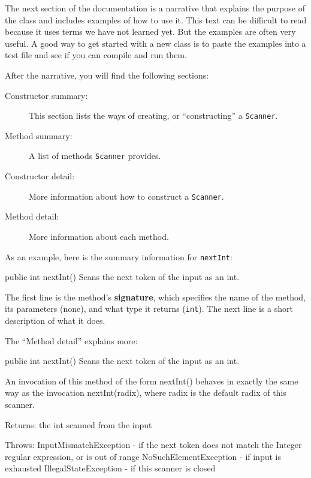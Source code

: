 \documentclass[12pt]{book}
\theoremstyle{exercise}
\newcommand{\java}[1]{\verb"#1"}
\newcommand{\java}[1]{\lstinline{#1}} %
\begin{document}

The next section of the documentation is a narrative that explains the purpose of the class and includes examples of how to use it.
This text can be difficult to read because it uses terms we have not learned yet.
But the examples are often very useful.
A good way to get started with a new class is to paste the examples into a test file and see if you can compile and run them.

After the narrative, you will find the following sections:

\begin{description}

\item[Constructor summary:]
This section lists the ways of creating, or ``constructing'' a \java{Scanner}.

\item[Method summary:]
A list of methods \java{Scanner} provides.

\item[Constructor detail:]
More information about how to construct a \java{Scanner}.

\item[Method detail:]
More information about each method.

\end{description}

As an example, here is the summary information for \java{nextInt}:

\begin{stdout}
public int nextInt()
Scans the next token of the input as an int.
\end{stdout}


The first line is the method's {\bf signature}, which specifies the name of the method, its parameters (none), and what type it returns (\java{int}).
The next line is a short description of what it does.

The ``Method detail'' explains more:

\begin{stdout}
public int nextInt()
Scans the next token of the input as an int.

An invocation of this method of the form nextInt() behaves in
exactly the same way as the invocation nextInt(radix), where
radix is the default radix of this scanner.

Returns:
the int scanned from the input

Throws:
InputMismatchException - if the next token does not match
    the Integer regular expression, or is out of range
NoSuchElementException - if input is exhausted
IllegalStateException - if this scanner is closed
\end{stdout}
\end{document}
